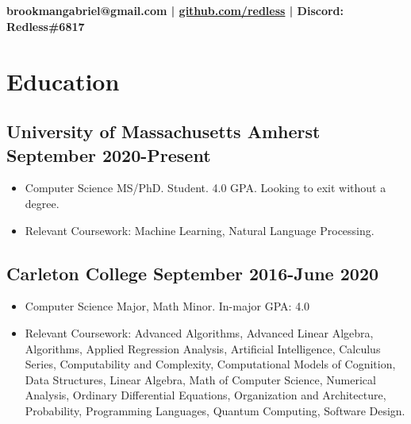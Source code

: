 \documentclass[12pt]{article}
\begin{document}
{\selectfont

\section*{}
\begin{center}\textbf{brookmangabriel@gmail.com | \href{https://github.com/redless}{github.com/redless} | Discord: Redless\#6817}\end{center}
\section*{Education}

\subsection*{University of Massachusetts Amherst \hfill September 2020-Present} 
  \begin{itemize}

  \item Computer Science MS/PhD. Student. 4.0 GPA. Looking to exit without a degree.
\item
  Relevant Coursework: Machine Learning, Natural Language Processing.

\end{itemize}

  \subsection*{Carleton College \hfill September 2016-June 2020} 
  \begin{itemize}

  \item Computer Science Major, Math Minor. In-major GPA: 4.0
\item
  Relevant Coursework: Advanced Algorithms, Advanced Linear Algebra, Algorithms, Applied Regression Analysis, Artificial Intelligence, Calculus Series, Computability and Complexity, Computational Models of Cognition, Data Structures, Linear Algebra, Math of Computer Science, Numerical Analysis, Ordinary Differential Equations, Organization and
  Architecture, Probability, Programming Languages, Quantum Computing, Software Design.
  


\end{itemize}}
\end{document}
